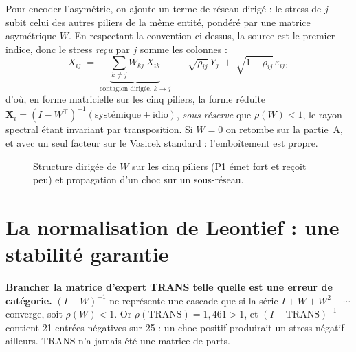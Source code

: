 Pour encoder l'asymétrie, on ajoute un terme de réseau dirigé : le stress de $j$ subit celui des
autres piliers de la même entité, pondéré par une matrice asymétrique $W$. En respectant
la convention ci-dessus, la source est le premier indice, donc le stress \emph{reçu} par $j$
somme les colonnes :
\begin{equation}
X_{ij} \;=\; \underbrace{\sum_{k\neq j} W_{kj}\,X_{ik}}_{\text{contagion dirigée, } k \to j}
   \;+\; \sqrt{\rho_{ij}}\,Y_j \;+\; \sqrt{1-\rho_{ij}}\,\varepsilon_{ij},
\end{equation}
d'où, en forme matricielle sur les cinq piliers, la forme réduite
$\mathbf X_i=(I-W^{\top})^{-1}(\text{systémique}+\text{idio})$, \emph{sous réserve} que
$\rho(W)<1$, le rayon spectral étant invariant par transposition. Si
$W=0$ on retombe sur la partie~A, et avec un seul facteur sur le Vasicek standard :
l'emboîtement est propre.

\begin{figure}[htbp]\centering
{}
\caption{Structure dirigée de $W$ sur les cinq piliers (P1 émet fort et reçoit peu) et
propagation d'un choc sur un sous-réseau.}
\end{figure}


\section{La normalisation de Leontief : une stabilité garantie}

\begin{attention}
\textbf{Brancher la matrice d'expert TRANS telle quelle est une erreur de catégorie.}
$(I-W)^{-1}$ ne représente une cascade que si la série $I+W+W^2+\cdots$ converge, soit
$\rho(W)<1$. Or $\rho(\mathrm{TRANS})=1{,}461>1$, et $(I-\mathrm{TRANS})^{-1}$ contient
21 entrées négatives sur 25 : un choc positif produirait un stress négatif ailleurs.
TRANS n'a jamais été une matrice de parts.
\end{attention}

